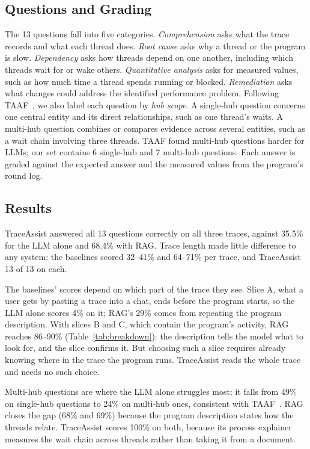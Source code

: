 \documentclass[10pt,conference]{IEEEtran}
\newcommand{\sysname}{TraceAssist\xspace}
\begin{document}
\subsection{Questions and Grading}

The 13 questions fall into five categories. \emph{Comprehension} asks what the trace records and what each thread does. \emph{Root cause} asks why a thread or the program is slow. \emph{Dependency} asks how threads depend on one another, including which threads wait for or wake others. \emph{Quantitative analysis} asks for measured values, such as how much time a thread spends running or blocked. \emph{Remediation} asks what changes could address the identified performance problem. Following TAAF~\cite{ezaz2026taaf}, we also label each question by \emph{hub scope}. A single-hub question concerns one central entity and its direct relationships, such as one thread's waits. A multi-hub question combines or compares evidence across several entities, such as a wait chain involving three threads. TAAF found multi-hub questions harder for LLMs; our set contains 6 single-hub and 7 multi-hub questions. Each answer is graded against the expected answer and the measured values from the program's round log.

\subsection{Results}

\sysname answered all 13 questions correctly on all three traces, against 35.5\% for the LLM alone and 68.4\% with RAG. Trace length made little difference to any system: the baselines scored 32--41\% and 64--71\% per trace, and \sysname 13 of 13 on each.

The baselines' scores depend on which part of the trace they see. Slice A, what a user gets by pasting a trace into a chat, ends before the program starts, so the LLM alone scores 4\% on it; RAG's 29\% comes from repeating the program description. With slices B and C, which contain the program's activity, RAG reaches 86--90\% (Table~\ref{tab:breakdown}): the description tells the model what to look for, and the slice confirms it. But choosing such a slice requires already knowing where in the trace the program runs. \sysname reads the whole trace and needs no such choice.

Multi-hub questions are where the LLM alone struggles most: it falls from 49\% on single-hub questions to 24\% on multi-hub ones, consistent with TAAF~\cite{ezaz2026taaf}. RAG closes the gap (68\% and 69\%) because the program description states how the threads relate. \sysname scores 100\% on both, because its process explainer measures the wait chain across threads rather than taking it
from a document.
\end{document}
